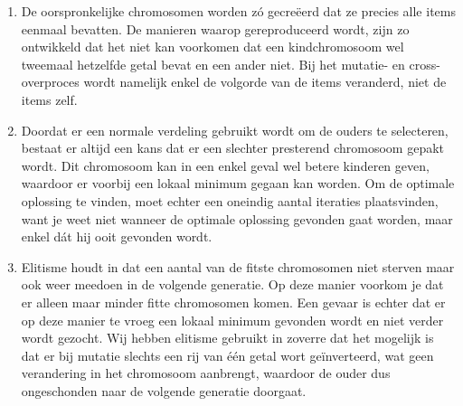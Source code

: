 \documentclass[a4paper,10pt,fleqn]{article}
\begin{document}
\begin{enumerate}[1.]
    \item De oorspronkelijke chromosomen worden zó gecreëerd dat ze precies alle items eenmaal bevatten. De manieren waarop gereproduceerd wordt, zijn zo ontwikkeld dat het niet kan voorkomen dat een kindchromosoom wel tweemaal hetzelfde getal bevat en een ander niet. Bij het mutatie- en cross-overproces wordt namelijk enkel de volgorde van de items veranderd, niet de items zelf.

    \item Doordat er een normale verdeling gebruikt wordt om de ouders te selecteren, bestaat er altijd een kans dat er een slechter presterend chromosoom gepakt wordt. Dit chromosoom kan in een enkel geval wel betere kinderen geven, waardoor er voorbij een lokaal minimum gegaan kan worden. Om de optimale oplossing te vinden, moet echter een oneindig aantal iteraties plaatsvinden, want je weet niet wanneer de optimale oplossing gevonden gaat worden, maar enkel dát hij ooit gevonden wordt.

    \item Elitisme houdt in dat een aantal van de fitste chromosomen niet sterven maar ook weer meedoen in de volgende generatie. Op deze manier voorkom je dat er alleen maar minder fitte chromosomen komen. Een gevaar is echter dat er op deze manier te vroeg een lokaal minimum gevonden wordt en niet verder wordt gezocht. Wij hebben elitisme gebruikt in zoverre dat het mogelijk is dat er bij mutatie slechts een rij van één getal wort geïnverteerd, wat geen verandering in het chromosoom aanbrengt, waardoor de ouder dus ongeschonden naar de volgende generatie doorgaat.

\end{enumerate}
\end{document}
